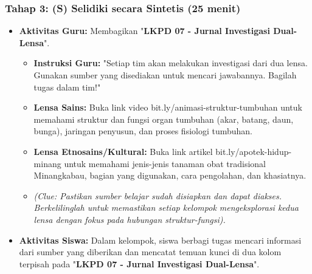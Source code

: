 \documentclass[a4paper,12pt]{article}
\begin{document}
\subsubsection{Tahap 3: (S) Selidiki secara Sintetis (25 menit)}
\begin{itemize}
\item \textbf{Aktivitas Guru:} Membagikan "\textbf{LKPD 07 - Jurnal Investigasi Dual-Lensa}".
    \begin{itemize}
    \item \textbf{Instruksi Guru:} "Setiap tim akan melakukan investigasi dari dua lensa. Gunakan sumber yang disediakan untuk mencari jawabannya. Bagilah tugas dalam tim!"
    \item \textbf{Lensa Sains:} Buka link video bit.ly/animasi-struktur-tumbuhan untuk memahami struktur dan fungsi organ tumbuhan (akar, batang, daun, bunga), jaringan penyusun, dan proses fisiologi tumbuhan.
    \item \textbf{Lensa Etnosains/Kultural:} Buka link artikel bit.ly/apotek-hidup-minang untuk memahami jenis-jenis tanaman obat tradisional Minangkabau, bagian yang digunakan, cara pengolahan, dan khasiatnya.
    \item \textit{(Clue: Pastikan sumber belajar sudah disiapkan dan dapat diakses. Berkelilinglah untuk memastikan setiap kelompok mengeksplorasi kedua lensa dengan fokus pada hubungan struktur-fungsi).}
    \end{itemize}
\item \textbf{Aktivitas Siswa:} Dalam kelompok, siswa berbagi tugas mencari informasi dari sumber yang diberikan dan mencatat temuan kunci di dua kolom terpisah pada "\textbf{LKPD 07 - Jurnal Investigasi Dual-Lensa}".
\end{itemize}
\end{document}

